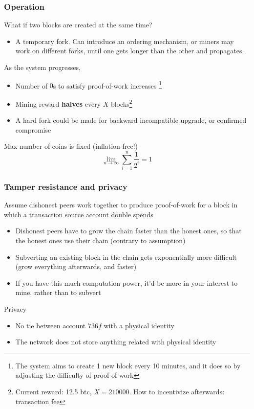 \documentclass{beamer}
\begin{document}
\begin{frame}
\frametitle{Operation}

What if two blocks are created at the same time?
\begin{itemize}
  \item A temporary fork. Can introduce an ordering mechanism, or miners may work on different forks, until one gets longer than the other and propagates.
\end{itemize}

\vspace{0.1in}
As the system progresses,
\begin{itemize}
  \item Number of $0$s to satisfy proof-of-work increases \footnote{The system aims to create 1 new block every 10 minutes, and it does so by adjusting the difficulty of proof-of-work}
  \item Mining reward \textbf{halves} every $X$ blocks\footnote{Current reward: 12.5 btc, $X = 210000$. How to incentivize afterwards: transaction fee}
  \item A hard fork could be made for backward incompatible upgrade, or confirmed compromise
\end{itemize}

\vspace{0.1in}
Max number of coins is fixed (inflation-free!)
$$
\lim\limits_{n \to \infty}{\sum_{i = 1}^{n}{\frac{1}{2^i}}} = 1
$$

\end{frame}

\begin{frame}
\frametitle{Tamper resistance and privacy}

Assume dishonest peers work together to produce proof-of-work for a block in which a transaction source account double spends
\begin{itemize}
  \item Dishonest peers have to grow the chain faster than the honest ones, so that the honest ones use their chain (contrary to assumption)
  \item Subverting an existing block in the chain gets exponentially more difficult (grow everything afterwards, and faster)
  \item If you have this much computation power, it'd be more in your interest to mine, rather than to subvert
\end{itemize}

\vspace{0.2in}
Privacy
\begin{itemize}
  \item No tie between account $736f$ with a physical identity
  \item The network does not store anything related with physical identity
\end{itemize}

\end{frame}
\end{document}
